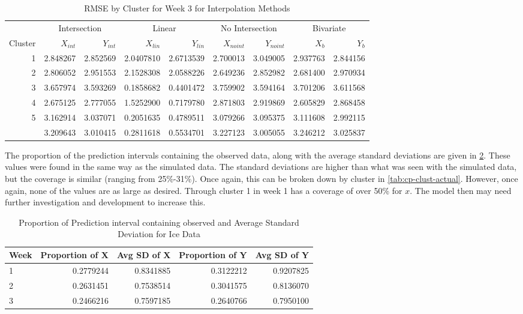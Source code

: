 \documentclass[12pt]{article}
\begin{document}
\begin{table}

\caption{\label{tab:results-clust3-actual}RMSE by Cluster for Week 3 for Interpolation Methods}
\centering
\begin{tabular}[t]{rrrrrrrrr}
\toprule
\multicolumn{1}{c}{ } & \multicolumn{2}{c}{Intersection} & \multicolumn{2}{c}{Linear} & \multicolumn{2}{c}{No Intersection} & \multicolumn{2}{c}{Bivariate} \\
\cmidrule(l{3pt}r{3pt}){2-3} \cmidrule(l{3pt}r{3pt}){4-5} \cmidrule(l{3pt}r{3pt}){6-7} \cmidrule(l{3pt}r{3pt}){8-9}
Cluster & $X_{int}$ & $Y_{int}$ & $X_{lin}$ & $Y_{lin}$ & $X_{noint}$ & $Y_{noint}$ & $X_b$ & $Y_b$\\
\midrule
1 & 2.848267 & 2.852569 & 2.0407810 & 2.6713539 & 2.700013 & 3.049005 & 2.937763 & 2.844156\\
2 & 2.806052 & 2.951553 & 2.1528308 & 2.0588226 & 2.649236 & 2.852982 & 2.681400 & 2.970934\\
3 & 3.657974 & 3.593269 & 0.1858682 & 0.4401472 & 3.759902 & 3.594164 & 3.701206 & 3.611568\\
4 & 2.675125 & 2.777055 & 1.5252900 & 0.7179780 & 2.871803 & 2.919869 & 2.605829 & 2.868458\\
5 & 3.162914 & 3.037071 & 0.2051635 & 0.4789511 & 3.079266 & 3.095375 & 3.111608 & 2.992115\\
\addlinespace
6 & 3.209643 & 3.010415 & 0.2811618 & 0.5534701 & 3.227123 & 3.005055 & 3.246212 & 3.025837\\
\bottomrule
\end{tabular}
\end{table}

The proportion of the prediction intervals containing the observed data,
along with the average standard deviations are given in
\cref{tab:cp-table}. These values were found in the same way as the
simulated data. The standard deviations are higher than what was seen
with the simulated data, but the coverage is similar (ranging from
25\%-31\%). Once again, this can be broken down by cluster in
\cref{tab:cp-clust-actual}. However, once again, none of the values are
as large as desired. Through cluster 1 in week 1 has a coverage of over
50\% for \(x\). The model then may need further investigation and
development to increase this.

\begin{table}

\caption{\label{tab:cp-table}Proportion of Prediction interval containing observed and Average Standard Deviation for Ice Data}
\centering
\begin{tabular}[t]{lrrrr}
\toprule
Week & Proportion of X & Avg SD of X & Proportion of Y & Avg SD of Y\\
\midrule
1 & 0.2779244 & 0.8341885 & 0.3122212 & 0.9207825\\
2 & 0.2631451 & 0.7538514 & 0.3041575 & 0.8136070\\
3 & 0.2466216 & 0.7597185 & 0.2640766 & 0.7950100\\
\bottomrule
\end{tabular}
\end{table}
\end{document}
